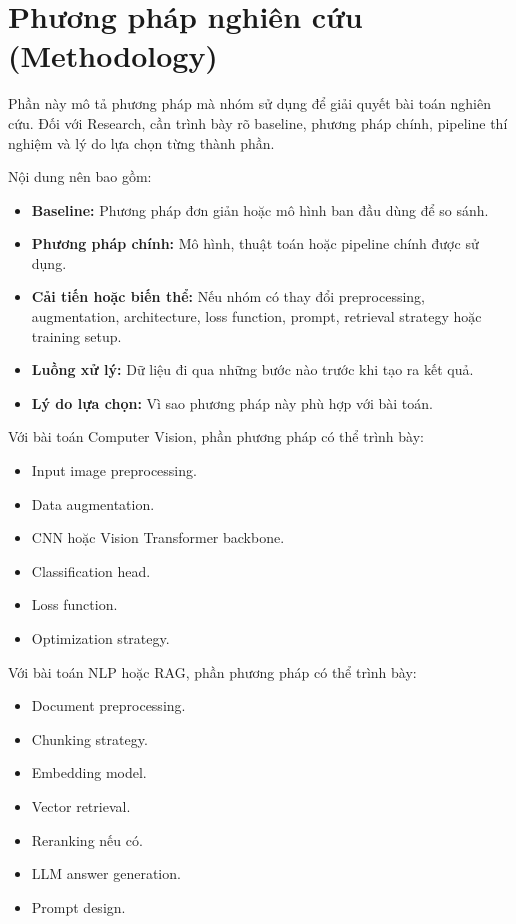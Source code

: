 \documentclass[12pt]{ai_conquer2026}
\begin{document}
\section{Phương pháp nghiên cứu (Methodology)}

Phần này mô tả phương pháp mà nhóm sử dụng để giải quyết bài toán nghiên cứu. Đối với Research, cần trình bày rõ baseline, phương pháp chính, pipeline thí nghiệm và lý do lựa chọn từng thành phần.

Nội dung nên bao gồm:

\begin{itemize}
\item \textbf{Baseline:} Phương pháp đơn giản hoặc mô hình ban đầu dùng để so sánh.
\item \textbf{Phương pháp chính:} Mô hình, thuật toán hoặc pipeline chính được sử dụng.
\item \textbf{Cải tiến hoặc biến thể:} Nếu nhóm có thay đổi preprocessing, augmentation, architecture, loss function, prompt, retrieval strategy hoặc training setup.
\item \textbf{Luồng xử lý:} Dữ liệu đi qua những bước nào trước khi tạo ra kết quả.
\item \textbf{Lý do lựa chọn:} Vì sao phương pháp này phù hợp với bài toán.
\end{itemize}

\begin{aivncodebox}[Ví dụ:]
Với bài toán Computer Vision, phần phương pháp có thể trình bày:

\begin{itemize}
\item Input image preprocessing.
\item Data augmentation.
\item CNN hoặc Vision Transformer backbone.
\item Classification head.
\item Loss function.
\item Optimization strategy.
\end{itemize}

\end{aivncodebox}

\begin{aivncodebox}[Ví dụ:]
Với bài toán NLP hoặc RAG, phần phương pháp có thể trình bày:

\begin{itemize}
\item Document preprocessing.
\item Chunking strategy.
\item Embedding model.
\item Vector retrieval.
\item Reranking nếu có.
\item LLM answer generation.
\item Prompt design.
\end{itemize}

\end{aivncodebox}
\end{document}
